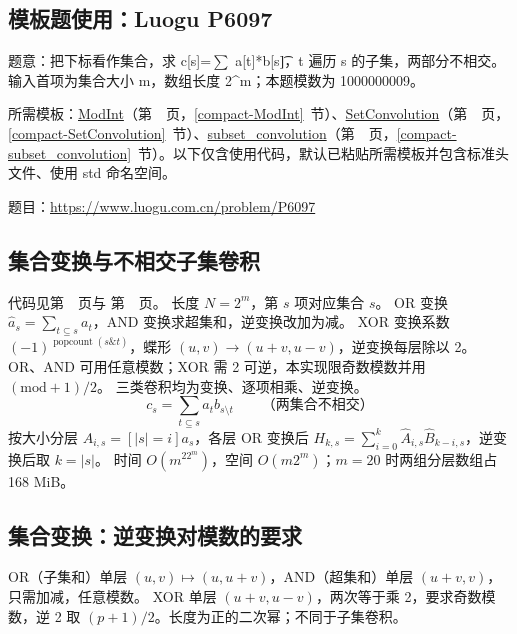 \subsection*{模板题使用：Luogu P6097}

\label{usage-example-51}

题意：把下标看作集合，求 c[s]=$\sum$ a[t]*b[s\t]，t 遍历 s 的子集，两部分不相交。输入首项为集合大小 m，数组长度 2\textasciicircum{}m；本题模数为 1000000009。

所需模板：\hyperref[compact-ModInt]{ModInt}（第~\pageref{compact-ModInt}~页，\ref{compact-ModInt}~节）、\hyperref[compact-SetConvolution]{SetConvolution}（第~\pageref{compact-SetConvolution}~页，\ref{compact-SetConvolution}~节）、\hyperref[compact-subset_convolution]{subset\_\allowbreak{}convolution}（第~\pageref{compact-subset_convolution}~页，\ref{compact-subset_convolution}~节）。以下仅含使用代码，默认已粘贴所需模板并包含标准头文件、使用 std 命名空间。

题目：\url{https://www.luogu.com.cn/problem/P6097}



\subsection{集合变换与不相交子集卷积}\label{knowledge-subset-conv}
代码见第~\pageref{compact-SetConvolution}~页与
第~\pageref{compact-subset_convolution}~页。
长度 $N=2^m$，第 $s$ 项对应集合 $s$。
OR 变换 $\widehat a_s=\sum_{t\subseteq s}a_t$，AND 变换求超集和，逆变换改加为减。
XOR 变换系数 $(-1)^{\operatorname{popcount}(s\mathbin{\&}t)}$，蝶形 $(u,v)\to(u+v,u-v)$，逆变换每层除以 2。
OR、AND 可用任意模数；XOR 需 2 可逆，本实现限奇数模数并用 $(\mathrm{mod}+1)/2$。
三类卷积均为变换、逐项相乘、逆变换。
\[
 c_s=\sum_{t\subseteq s}a_t b_{s\setminus t}
 \qquad\text{（两集合不相交）}
\]
按大小分层 $A_{i,s}=[|s|=i]a_s$，各层 OR 变换后
$H_{k,s}=\sum_{i=0}^k\widehat A_{i,s}\widehat B_{k-i,s}$，逆变换后取 $k=|s|$。
时间 $O(m^22^m)$，空间 $O(m2^m)$；$m=20$ 时两组分层数组占 168 MiB。

\clearpage


\subsection{集合变换：逆变换对模数的要求}\label{knowledge-fwt-inverse}
OR（子集和）单层 $(u,v)\mapsto(u,u+v)$，AND（超集和）单层 $(u+v,v)$，只需加减，任意模数。
XOR 单层 $(u+v,u-v)$，两次等于乘 2，要求奇数模数，逆 2 取 $(p+1)/2$。长度为正的二次幂；不同于子集卷积。


